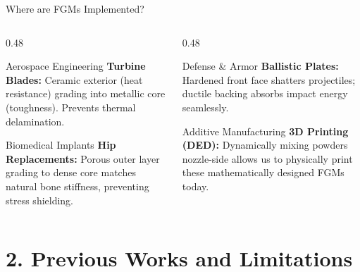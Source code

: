 \documentclass[aspectratio=169, 11pt]{beamer}
\begin{document}
\begin{frame}{Where are FGMs Implemented?}
  \vspace{-0.5em}
  \begin{columns}
    \begin{column}{0.48\textwidth}
      \begin{block}{Aerospace Engineering}
        \textbf{Turbine Blades:} 
        Ceramic exterior (heat resistance) grading into metallic core (toughness). Prevents thermal delamination.
      \end{block}
      \begin{block}{Biomedical Implants}
        \textbf{Hip Replacements:} 
        Porous outer layer grading to dense core matches natural bone stiffness, preventing stress shielding.
      \end{block}
    \end{column}
    
    \begin{column}{0.48\textwidth}
      \begin{block}{Defense \& Armor}
        \textbf{Ballistic Plates:} 
        Hardened front face shatters projectiles; ductile backing absorbs impact energy seamlessly.
      \end{block}
      \begin{block}{Additive Manufacturing}
        \textbf{3D Printing (DED):} 
        Dynamically mixing powders nozzle-side allows us to physically print these mathematically designed FGMs today.
      \end{block}
    \end{column}
  \end{columns}
\end{frame}

\section{2. Previous Works and Limitations}
\end{document}
